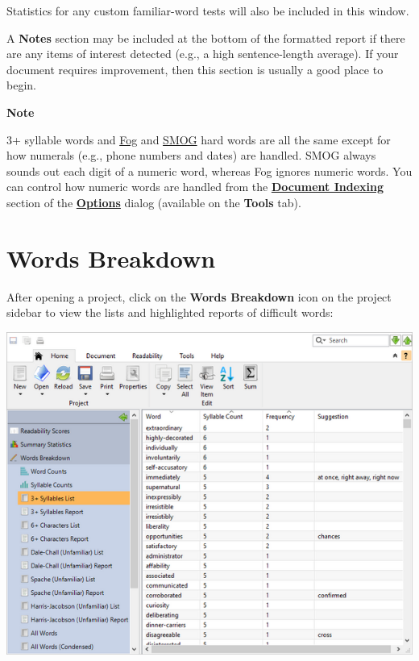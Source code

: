 \documentclass[
]{book}
\newenvironment{notesection}
    {
    \begin{tcolorbox}[colframe=mediumblue,colback=lightblue,coltext=mediumblue,arc=3mm]
    \faLightbulb[regular] \textbf{Note} \newline
    }
    {
    \end{tcolorbox}
    }
\theoremstyle{definition}
\theoremstyle{definition}
\theoremstyle{definition}
\theoremstyle{definition}
\theoremstyle{remark}
\begin{document}
Statistics for any custom familiar-word tests will also be included in this window.

A \textbf{Notes} section may be included at the bottom of the formatted report if there are any items of interest detected (e.g., a high sentence-length average). If your document requires improvement, then this section is usually a good place to begin.

\begin{notesection}
3+ syllable words and \protect\hyperlink{gunning-fog-test}{Fog} and \protect\hyperlink{smog-test}{SMOG} hard words are all the same except for how numerals (e.g., phone numbers and dates) are handled. SMOG always sounds out each digit of a numeric word, whereas Fog ignores numeric words. You can control how numeric words are handled from the \protect\hyperlink{document-analysis}{\textbf{Document Indexing}} section of the \protect\hyperlink{options-overview}{\textbf{Options}} dialog (available on the \textbf{Tools} tab).

\end{notesection}

\hypertarget{reviewing-word-breakdowns}{%
\section{Words Breakdown}\label{reviewing-word-breakdowns}}

After opening a project, click on the \textbf{Words Breakdown} icon on the project sidebar to view the lists and highlighted reports of difficult words:

\includegraphics{Images/difficultwords.png}
\end{document}

